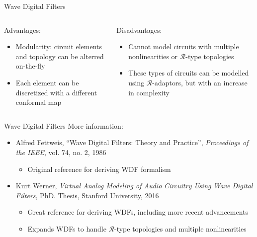 \begin{frame}{Wave Digital Filters}
    \begin{columns}
        \begin{column}{0.5\linewidth}
            \hspace{-1ex}
            Advantages:
            \vspace{1ex}
            \begin{itemize}
                \itemsep0.5em
                \item Modularity: circuit elements and topology can be alterred on-the-fly
                \item Each element can be discretized with a different conformal map
            \end{itemize}
        \end{column}
        \begin{column}{0.5\linewidth}
            \hspace{-1ex}
            Disadvantages:
            \vspace{1ex}
            \begin{itemize}
                \itemsep0.5em
                \item Cannot model circuits with multiple nonlinearities or $\mathcal{R}$-type topologies
                \item These types of circuits can be modelled using $\mathcal{R}$-adaptors,
                but with an increase in complexity
            \end{itemize}
        \end{column}
    \end{columns}
\end{frame}

\begin{frame}{Wave Digital Filters}
    More information:
    \vspace{1ex}
    \begin{itemize}
        \itemsep0.75em
        \item Alfred Fettweis, ``Wave Digital Filters: Theory and Practice'',
        \emph{Proceedings of the IEEE}, vol. 74, no. 2, 1986
        \begin{itemize}
            \item Original reference for deriving WDF formalism
        \end{itemize}

        \item Kurt Werner, \emph{Virtual Analog Modeling of Audio Circuitry Using Wave Digital Filters},
        PhD. Thesis, Stanford University, 2016
        \begin{itemize}
            \item Great reference for deriving WDFs, including more recent advancements
            \item Expands WDFs to handle $\mathcal{R}$-type topologies and multiple nonlinearities
        \end{itemize}
    \end{itemize}
\end{frame}

